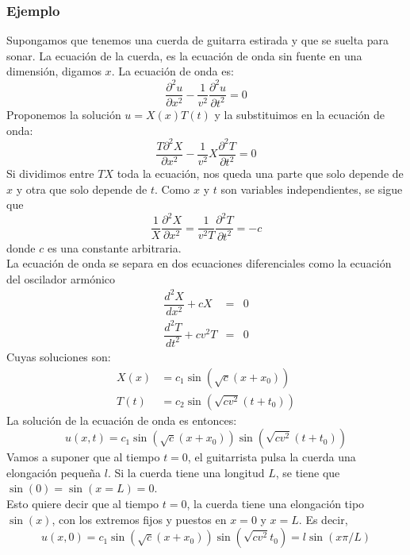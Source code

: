 \subsubsection{Ejemplo}
Supongamos que tenemos una cuerda de guitarra estirada y que se suelta para sonar. La ecuación de la cuerda, es la ecuación de onda sin fuente en una dimensión, digamos $x$. La ecuación de onda es:
\begin{equation}
\dfrac{\partial^{2}u }{\partial x^{2}} - \dfrac{1}{v^{2}} \dfrac{\partial^{2}u}{\partial t^{2}} = 0 
\label{eq:eq_onda}
\end{equation}
Proponemos la solución $u = X(x)T(t)$ y la substituimos en la ecuación de onda:
\begin{equation}
\dfrac{ T \partial^{2} X }{\partial x^{2}} - \dfrac{1}{v^{2}} X \dfrac{\partial^{2}T}{\partial t^{2}} = 0
\end{equation}
Si dividimos entre $TX$ toda la ecuación, nos queda una parte que solo depende de $x$ y otra que solo depende de $t$. Como $x$ y $t$ son variables independientes, se sigue que
\begin{equation}
\dfrac{1}{X} \dfrac{ \partial^{2} X }{\partial x^{2}} = \dfrac{1}{v^{2}T}  \dfrac{\partial^{2}T}{\partial t^{2}} = -c
\end{equation}
donde $c$ es una constante arbitraria.
\\
La ecuación de onda se separa en dos ecuaciones diferenciales como la ecuación del oscilador armónico
\begin{eqnarray}
\dfrac{d^{2} X}{dx^{2}} + cX &=& 0 \\
\dfrac{d^{2} T}{dt^{2}} + c v^{2} T &=& 0
\end{eqnarray}
Cuyas soluciones son:
\begin{eqnarray}
X(x) &= c_{1} \sin(\sqrt{c}(x+x_{0})) \\
T(t) &= c_{2} \sin(\sqrt{cv^{2}}(t+t_{0}))
\end{eqnarray}
La solución de la ecuación de onda es entonces:
\begin{equation}
u(x,t) = c_{1} \sin(\sqrt{c}(x+x_{0})) \sin(\sqrt{cv^{2}}(t+t_{0}))
\end{equation}
Vamos a suponer que al tiempo $t = 0$, el guitarrista pulsa la cuerda una elongación pequeña $l$. Si la cuerda tiene una longitud $L$, se tiene que $\sin(0) = \sin(x =
L) = 0$.
\\
Esto quiere decir que al tiempo $t = 0$, la cuerda tiene una elongación tipo
$\sin(x)$, con los extremos fijos y puestos en $x = 0$ y $x = L$. Es decir,
\[ u(x, 0) = c_{1} \sin(\sqrt{c} (x + x_{0}))\sin(\sqrt{cv^{2}}t_{0}) = l \sin(x\pi/L) \]
